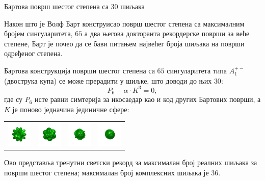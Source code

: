 ﻿\documentclass[en]{./../../common/SurferDesc}%
\begin{document}
\footnotesize



\begin{surferPage}
  \begin{surferTitle}Бартова површ шестог степена са 30 шиљака\end{surferTitle}  

    Након што је Волф Барт конструисао површ шестог степена са максималним бројем 
	сингуларитета, $65$ а два његова докторанта рекордерске површи за веће степене, 
    Барт је почео да се бави питањем највећег броја шиљака на површи одређеног степена.

   Бартова конструкција површи шестог степена са $65$ сингуларитета типа 
    $A_1^{+-}$ (двострука купа) се може прерадити у шиљке, што доводи до њих  $30$: 
    \[P_6 - \alpha \cdot K^3=0,\]
  где су  $P_6$ исте равни симтерија за икосаедар
    као и код других Бартових површи, а $K$ је
    поново једначина јединичне сфере:
    \vspace*{-0.4em}
    \begin{center}
      \begin{tabular}{c@{\ }c@{\ }c@{\ }c}
        \includegraphics[height=1.2cm]{./../../common/images/barthsextic_30A2}
        &
        \includegraphics[height=1.2cm]{./../../common/images/barthsextic_30A2_3}
        &
        \includegraphics[height=1.2cm]{./../../common/images/barthsextic_30A2_5}
        &
        \includegraphics[height=1.2cm]{./../../common/images/barthsextic_30A2_6}
      \end{tabular}
    \end{center}    
    \vspace*{-0.3em}
     Ово представља тренутни светски рекорд за максималан број реалних шиљака за површи шестог степена;
	 максималан број комплексних шиљака је  $36$. 



  \begin{surferText}
     \end{surferText}
\end{surferPage}
\end{document}
